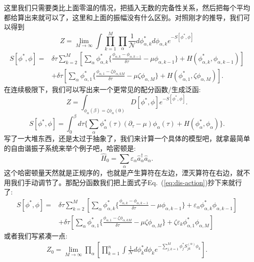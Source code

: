\documentclass[12pt, a4paper, oneside]{ctexart}
\begin{document}
这里我们只需要类比上面零温的情况，把插入无数的完备性关系，然后把每个平均都给算出来就可以了，这里和上面的振幅没有什么区别。对照刚才的推导，我们可以得到
\begin{equation}
    Z=\lim_{M\rightarrow\infty}\int\prod_{k=1}^M\prod_\alpha\frac{1}{\mathcal N}d\phi_{\alpha,k}^*d\phi_{\alpha,k}e^{-S[\phi^*,\phi]}
\end{equation}
\begin{align}
    S[\phi^*,\phi]=&\delta \tau\sum_{k=2}^M[\sum_\alpha \phi_{\alpha,k}^*\{  \frac{\phi_{\alpha,k}-\phi_{\alpha,k-1}}{\delta \tau} -\mu\phi_{\alpha,k-1} \}+H(\phi^*_{\alpha,k},\phi_{\alpha,k-1})]\nonumber\\ 
    &+\delta\tau[\sum_\alpha \phi^*_{\alpha,1}\{  \frac{\phi_{\alpha,1}-\zeta\phi_{\alpha,kM}}{\delta \tau} -\mu\zeta\phi_{\alpha,M} \}  +H(\phi^*_{\alpha,1},\zeta\phi_{\alpha,M})]\label{eq:dis-action}.
\end{align}
在连续极限下，我们可以写出来一个更常见的配分函数/生成泛函:
\begin{equation}
    Z=\int_{\phi_\alpha(\beta)=\zeta\phi_\alpha(0)} D[\phi^*,\phi]e^{-S[\phi^*,\phi]}.
\end{equation}
\begin{equation}
    S[\phi^*,\phi]=\int_0^\beta d\tau\{ \sum_\alpha \phi^*_\alpha(\tau)(\partial_\tau-\mu)\phi_\alpha(\tau)+H(\phi^*_\alpha,\phi_\alpha)  \}.
\end{equation}
写了一大堆东西，还是太过于抽象了，我们来计算一个具体的模型吧，就拿最简单的自由谐振子系统来举个例子吧，哈密顿是:
\begin{equation}
    \hat H_0=\sum_\alpha \varepsilon_\alpha \hat a^\dagger_\alpha \hat a_\alpha.
\end{equation}
这个哈密顿量天然就是正规序的，也就是产生算符在左边，湮灭算符在右边，就不用我们手动调节了。那配分函数我们把上面式子Eq.~(\ref{eq:dis-action})抄下来就行了:
\begin{align}
    S[\phi^*,\phi]=&\delta \tau\sum_{k=2}^M[\sum_\alpha \phi_{\alpha,k}^*\{  \frac{\phi_{\alpha,k}-\phi_{\alpha,k-1}}{\delta \tau} -\mu\phi_{\alpha,k-1} \}+\varepsilon_\alpha \phi^*_{\alpha,k}\phi_{\alpha,k-1}]\nonumber\\ 
    &+\delta\tau[\sum_\alpha \phi^*_{\alpha,1}\{  \frac{\phi_{\alpha,1}-\zeta\phi_{\alpha,kM}}{\delta \tau} -\mu\zeta\phi_{\alpha,M} \}  +\zeta\varepsilon_k\phi^*_{\alpha,1}\phi_{\alpha,M}]
\end{align}
或者我们写紧凑一点:
\begin{align} 
Z_0=\lim_{M\rightarrow \infty}\prod_\alpha[\prod_{k=1}^n \int \frac{1}{\mathcal N}d\phi_k^*d\phi_k e^{-\sum_{j,k=1}^M \phi_j^* S^{(\alpha)}_{jk}\phi_k}]. 
\end{align}
\end{document}
